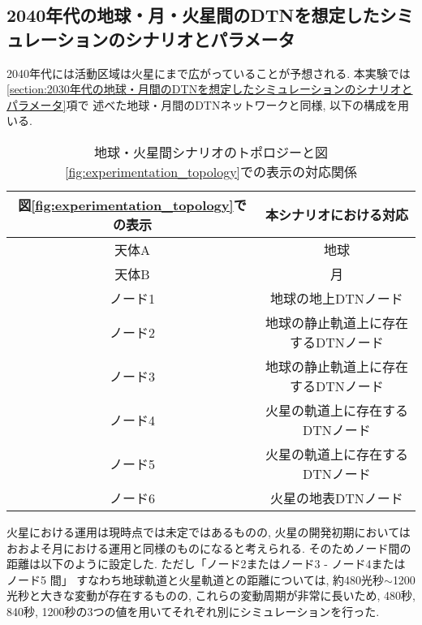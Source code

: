 \subsection{2040年代の地球・月・火星間のDTNを想定したシミュレーションのシナリオとパラメータ}
\label{section:2040年代の地球・月・火星間のDTNを想定したシミュレーションのシナリオとパラメータ}
2040年代には活動区域は火星にまで広がっていることが予想される. 
本実験では\ref{section:2030年代の地球・月間のDTNを想定したシミュレーションのシナリオとパラメータ}項で
述べた地球・月間のDTNネットワークと同様, 以下の構成を用いる. 

\begin{table}[htbp]
    \centering
    \caption{地球・火星間シナリオのトポロジーと図\ref{fig:experimentation_topology}での表示の対応関係}
    \vspace{3mm}
    \begin{tabular}{cc}  \hline
        図\ref{fig:experimentation_topology}での表示 & 本シナリオにおける対応 \\ \hline
        天体A & 地球 \\
        天体B & 月 \\
        ノード1 & 地球の地上DTNノード \\
        ノード2 & 地球の静止軌道上に存在するDTNノード \\
        ノード3 & 地球の静止軌道上に存在するDTNノード \\
        ノード4 & 火星の軌道上に存在するDTNノード \\
        ノード5 & 火星の軌道上に存在するDTNノード \\
        ノード6 & 火星の地表DTNノード \\ \hline
    \end{tabular}
    \label{table:earth_mars_scenario_topology}
\end{table}

火星における運用は現時点では未定ではあるものの, 
火星の開発初期においてはおおよそ月における運用と同様のものになると考えられる. 
そのためノード間の距離は以下のように設定した. ただし「ノード2またはノード3 - ノード4またはノード5  間」
すなわち地球軌道と火星軌道との距離については, 約480光秒$\sim$1200光秒と大きな変動が存在するものの, 
これらの変動周期が非常に長いため, 480秒, 840秒, 1200秒の3つの値を用いてそれぞれ別にシミュレーションを行った.


